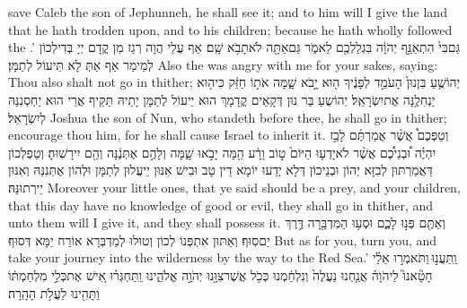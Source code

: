 {save Caleb the son of Jephunneh, he shall see it; and to him will I give the land that he hath trodden upon, and to his children; because he hath wholly followed the \lord.’}{}
{גַּם\maqqaf בִּי֙ הִתְאַנַּ֣ף יְהֹוָ֔ה בִּגְלַלְכֶ֖ם לֵאמֹ֑ר גַּם\maqqaf אַתָּ֖ה לֹא\maqqaf תָבֹ֥א שָֽׁם׃}
{אַף עֲלַי הֲוָה רְגַז מִן קֳדָם יְיָ בְּדִילְכוֹן לְמֵימַר אַף אַתְּ לָא תֵּיעוֹל לְתַמָּן׃}
{Also the \lord\space was angry with me for your sakes, saying: Thou also shalt not go in thither;}{}
{יְהוֹשֻׁ֤עַ בִּן\maqqaf נוּן֙ הָעֹמֵ֣ד לְפָנֶ֔יךָ ה֖וּא יָ֣בֹא שָׁ֑מָּה אֹת֣וֹ חַזֵּ֔ק כִּי\maqqaf ה֖וּא יַנְחִלֶ֥נָּה אֶת\maqqaf יִשְׂרָאֵֽל׃}
{יְהוֹשֻעַ בַּר נוּן דְּקָאֵים קֳדָמָךְ הוּא יֵיעוֹל לְתַמָּן יָתֵיהּ תַּקֵּיף אֲרֵי הוּא יַחְסְנִנַּהּ לְיִשְׂרָאֵל׃}
{Joshua the son of Nun, who standeth before thee, he shall go in thither; encourage thou him, for he shall cause Israel to inherit it.}{}
{וְטַפְּכֶם֩ אֲשֶׁ֨ר אֲמַרְתֶּ֜ם לָבַ֣ז יִהְיֶ֗ה וּ֠בְנֵיכֶ֠ם אֲשֶׁ֨ר לֹא\maqqaf יָדְע֤וּ הַיּוֹם֙ ט֣וֹב וָרָ֔ע הֵ֖מָּה יָבֹ֣אוּ שָׁ֑מָּה וְלָהֶ֣ם אֶתְּנֶ֔נָּה וְהֵ֖ם יִירָשֽׁוּהָ׃}
{וְטַפְלְכוֹן דַּאֲמַרְתּוּן לְבִזָּא יְהוֹן וּבְנֵיכוֹן דְּלָא יְדַעוּ יוֹמָא דֵין טָב וּבִישׁ אִנּוּן יֵיעֲלוּן לְתַמָּן וּלְהוֹן אֶתְּנִנַּהּ וְאִנּוּן יֵירְתוּנַּהּ׃}
{Moreover your little ones, that ye said should be a prey, and your children, that this day have no knowledge of good or evil, they shall go in thither, and unto them will I give it, and they shall possess it.}{}
{וְאַתֶּ֖ם פְּנ֣וּ לָכֶ֑ם וּסְע֥וּ הַמִּדְבָּ֖רָה דֶּ֥רֶךְ יַם\maqqaf סֽוּף׃}
{וְאַתּוּן אִתְפְּנוֹ לְכוֹן וְטוּלוּ לְמַדְבְּרָא אוֹרַח יַמָּא דְּסוּף׃}
{But as for you, turn you, and take your journey into the wilderness by the way to the Red Sea.’}{}
{וַֽתַּעֲנ֣וּ \legarmeh  וַתֹּאמְר֣וּ אֵלַ֗י חָטָ֘אנוּ֮ לַיהֹוָה֒ אֲנַ֤חְנוּ נַעֲלֶה֙ וְנִלְחַ֔מְנוּ כְּכֹ֥ל אֲשֶׁר\maqqaf צִוָּ֖נוּ יְהֹוָ֣ה אֱלֹהֵ֑ינוּ וַֽתַּחְגְּר֗וּ אִ֚ישׁ אֶת\maqqaf כְּלֵ֣י מִלְחַמְתּ֔וֹ וַתָּהִ֖ינוּ לַעֲלֹ֥ת הָהָֽרָה׃}
